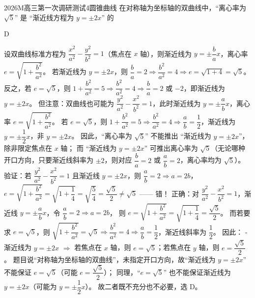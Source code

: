 
\begin{problem}{2026}{M}{高三第一次调研测试}{4}{圆锥曲线}
在对称轴为坐标轴的双曲线中，“离心率为 $\sqrt{5}$” 是 “渐近线方程为 $y=\pm2x$” 的
\begin{choices}
\end{choices}
\end{problem}

\begin{answer}
D
\end{answer}

\begin{solutions}
设双曲线标准方程为 $\dfrac{x^2}{a^2}-\dfrac{y^2}{b^2}=1$（焦点在 $x$ 轴），则渐近线为 $y=\pm\dfrac{b}{a}x$，离心率 $e=\sqrt{1+\dfrac{b^2}{a^2}}$。  
若渐近线为 $y=\pm2x$，则 $\dfrac{b}{a}=2\Rightarrow \dfrac{b^2}{a^2}=4\Rightarrow e=\sqrt{1+4}=\sqrt{5}$。  
反之，若 $e=\sqrt{5}$，则 $1+\dfrac{b^2}{a^2}=5\Rightarrow \dfrac{b^2}{a^2}=4\Rightarrow \dfrac{b}{a}=2$ 或 $-2$，即渐近线为 $y=\pm2x$。  
但注意：双曲线也可能为 $\dfrac{y^2}{a^2}-\dfrac{x^2}{b^2}=1$，此时渐近线为 $y=\pm\dfrac{a}{b}x$，离心率 $e=\sqrt{1+\dfrac{b^2}{a^2}}$。  
若 $e=\sqrt{5}$，则 $1+\dfrac{b^2}{a^2}=5\Rightarrow \dfrac{b^2}{a^2}=4\Rightarrow \dfrac{a}{b}=\dfrac{1}{2}$，渐近线为 $y=\pm\dfrac{1}{2}x$，非 $y=\pm2x$。  
因此，“离心率为 $\sqrt{5}$” 不能推出 “渐近线为 $y=\pm2x$”，除非限定焦点在 $x$ 轴；  
而 “渐近线为 $y=\pm2x$” 可推出离心率为 $\sqrt{5}$（无论哪种开口方向，只要渐近线斜率为 $\pm2$，则对应 $\dfrac{b}{a}=2$ 或 $\dfrac{a}{b}=2$，离心率均为 $\sqrt{5}$）。  
验证：若 $\dfrac{y^2}{a^2}-\dfrac{x^2}{b^2}=1$ 且渐近线 $y=\pm2x$，则 $\dfrac{a}{b}=2\Rightarrow a=2b$，  
$e=\sqrt{1+\dfrac{b^2}{a^2}}=\sqrt{1+\dfrac{1}{4}}=\sqrt{\dfrac{5}{4}}=\dfrac{\sqrt{5}}{2}\neq\sqrt{5}$ —— 错！  
正确：对 $\dfrac{y^2}{a^2}-\dfrac{x^2}{b^2}=1$，渐近线 $y=\pm\dfrac{a}{b}x$，令 $\dfrac{a}{b}=2\Rightarrow a=2b$，  
则 $e=\sqrt{1+\dfrac{b^2}{a^2}}=\sqrt{1+\dfrac{1}{4}}=\dfrac{\sqrt{5}}{2}$。  
而若要求 $e=\sqrt{5}$，则 $\sqrt{1+\dfrac{b^2}{a^2}}=\sqrt{5}\Rightarrow \dfrac{b^2}{a^2}=4\Rightarrow \dfrac{a}{b}=\dfrac{1}{2}$，渐近线斜率为 $\dfrac{1}{2}$。  
因此：  
- 渐近线为 $y=\pm2x$ $\Rightarrow$ 若焦点在 $x$ 轴，则 $e=\sqrt{5}$；若焦点在 $y$ 轴，则 $e=\dfrac{\sqrt{5}}{2}$。  
题目说“对称轴为坐标轴的双曲线”，未指定开口方向，故“渐近线为 $y=\pm2x$” 不能保证 $e=\sqrt{5}$（可能 $e=\dfrac{\sqrt{5}}{2}$）；  
同理，“$e=\sqrt{5}$” 也不能保证渐近线为 $y=\pm2x$（可能为 $y=\pm\dfrac{1}{2}x$）。  
故二者既不充分也不必要，选 D。
\end{solutions}